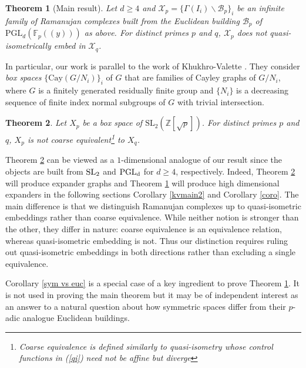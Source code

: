 \documentclass[letterpaper, reqno, 11pt]{amsart}
\newtheorem{theorem}{Theorem}[section]
\theoremstyle{definition}
\theoremstyle{definition}
\theoremstyle{remark}
\newcommand{\cal}{\mathcal}
\begin{document}
\begin{theorem} [Main result] \label{3}
    Let $d \geq 4$ and $\mathscr{X}_p= \{ \Gamma(I_i)\backslash \mathcal{B}_p \}_i$ be an infinite family of Ramanujan complexes built from the Euclidean building $\cal{B}_p$ of $\mathrm{PGL}_d(\mathbb{F}_p((y)))$ as above. For distinct primes $p$ and $q$, $\mathscr{X}_p$ does not quasi-isometrically embed in $\mathscr{X}_q$.
 \end{theorem}


In particular, our work is parallel to the work of Khukhro-Valette \cite{khukhro2017expanders}. They consider \textit{box spaces}
$\{\mathrm{Cay}(G/N_i)\}_i$ of $G$ that are families of Cayley graphs of $G/N_i$, where $G$ is a finitely generated residually finite group and $\{N_i\}$ is a decreasing sequence of finite index normal subgroups of $G$ with trivial intersection.

\begin{theorem} \label{kvmain} \cite[Theorem C-($1$)]{khukhro2017expanders}
    Let $X_p$ be a box space of $\mathrm{SL}_2(\mathbb{Z}[\sqrt{p}])$.
    For distinct primes $p$ and $q$, $X_p$ is not coarse equivalent\footnote{Coarse equivalence is defined similarly to quasi-isometry whose control functions in (\ref{qi}) need not be affine but diverge} to $X_q$.
\end{theorem}


Theorem \ref{kvmain} can be viewed as a $1$-dimensional analogue of our result since the objects are built from $\rm{SL}_2$ and $\rm{PGL}_d$ for $d \geq 4$, respectively.
Indeed, Theorem \ref{kvmain} will produce expander graphs and Theorem \ref{3} will produce high dimensional expanders in the following sections Corollary \ref{kvmain2} and Corollary \ref{coro}. The main difference is that we distinguish Ramanujan complexes up to quasi-isometric embeddings rather than coarse equivalence. 
While neither notion is stronger than the other, they differ in nature: coarse equivalence is an equivalence relation, whereas quasi-isometric embedding is not.
Thus our distinction requires ruling out quasi-isometric embeddings in both directions rather than excluding a single equivalence.



Corollary \ref{sym vs euc} is a special case of a key ingredient to prove Theorem \ref{3}. It is not used in proving the main theorem but it may be of independent interest as an answer to a natural question about how symmetric spaces differ from their $p$-adic analogue Euclidean buildings.
\end{document}
